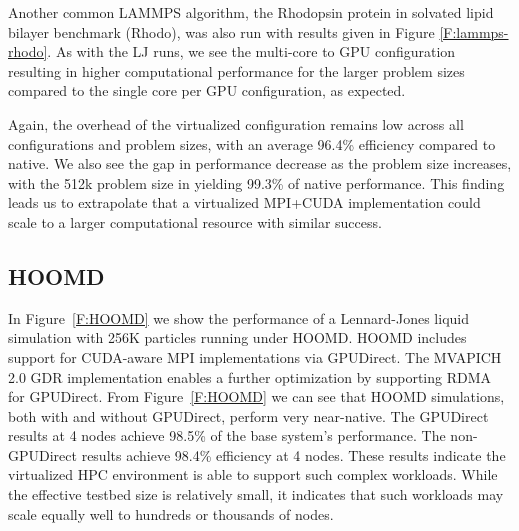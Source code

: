 \documentclass[10pt]{sigplanconf}
\begin{document}

Another common LAMMPS algorithm, the Rhodopsin protein in solvated lipid bilayer benchmark (Rhodo), was also run with results given in Figure \ref{F:lammps-rhodo}. As with the LJ runs, we see the multi-core to GPU configuration resulting in higher computational performance for the larger problem sizes compared to the single core per GPU configuration, as expected.  



Again, the overhead of the virtualized configuration remains low across all configurations and problem sizes, with an average 96.4\% efficiency compared to native. We also see the gap in performance decrease as the problem size increases, with the 512k problem size in yielding 99.3\% of native performance.  This finding leads us to extrapolate that a virtualized MPI+CUDA implementation could scale to a larger computational resource with similar success. 


\subsection{HOOMD}






In Figure~\ref{F:HOOMD} we show the performance of a Lennard-Jones liquid simulation with 256K particles running under HOOMD.  HOOMD includes support for CUDA-aware MPI implementations via GPUDirect.  The MVAPICH 2.0 GDR implementation enables a further optimization by supporting RDMA for GPUDirect. From Figure~\ref{F:HOOMD} we can see that HOOMD simulations, both with and without GPUDirect, perform very near-native.  The GPUDirect results at 4 nodes achieve 98.5\% of the base system's performance.  The non-GPUDirect results achieve 98.4\% efficiency at 4 nodes. These results indicate the virtualized HPC environment is able to support such complex workloads. While the effective testbed size is relatively small, it indicates that such workloads may scale equally well to hundreds or thousands of nodes. 
\end{document}
